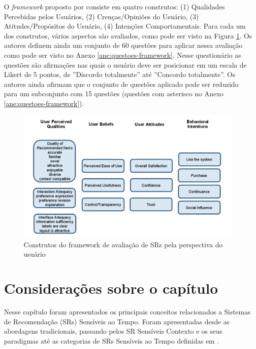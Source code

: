O \textit{framework} proposto por  consiste em quatro construtos: (1) Qualidades Percebidas pelos
Usuários, (2) Crenças/Opiniões do Usuário, (3) Atitudes/Propósitos do Usuário, (4) Intenções Comportamentais.
Para cada um dos construtos, vários aspectos são avaliados, como pode ser visto na Figura \ref{fig:resque-framework}.
Os autores definem ainda um conjunto de 60 questões para aplicar nessa avaliação como pode ser visto no Anexo
\ref{ane:questoes-framework}. Nesse questionário as questões são afirmações nas quais o usuário deve ser posicionar em
um escala de Likert de 5 pontos, de ''Discordo totalmente'' até ''Concordo totalmente''. Os autores ainda afirmam que o
conjunto de questões aplicado pode ser reduzido para um subconjunto com 15 questões (questões com asterisco no Anexo
\ref{ane:questoes-framework}).

\begin{figure}[htb]
  \caption{\label{fig:resque-framework}Construtos do framework de avaliação de SRs pela perspectiva do usuário}
  \begin{center}
      \includegraphics[scale=0.6]{./Figuras/resque-framework.png}
  \end{center}
\end{figure}

\section{Considerações sobre o capítulo}

Nesse capítulo foram apresentados os principais conceitos relacionados a Sistemas de Recomendação (SRs) Sensíveis ao Tempo.
Foram apresentadas desde as abordagens tradicionais, passando pelos SR Sensíveis Contexto e os seus paradigmas até as
categorias de SRs Sensíveis ao Tempo definidas em .

